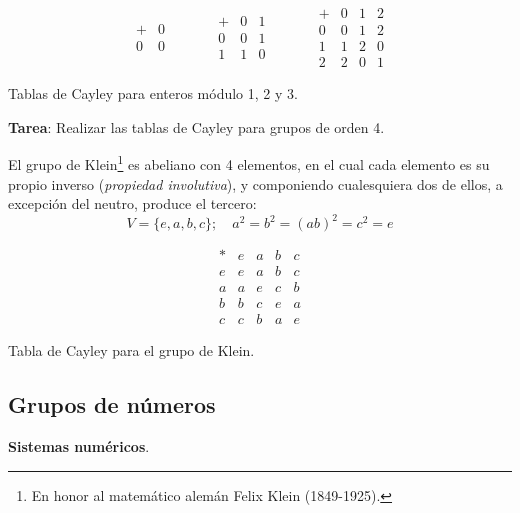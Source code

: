 \begin{table}[H]
	\centering
	\[ \begin{array}{c|c}
		+ & 0 \\ \hline
		0 & 0
	\end{array} \qquad \quad \begin{array}{c|cc}
		+ & 0 & 1 \\ \hline
		0 & 0 & 1 \\
		1 & 1 & 0
	\end{array} \qquad \quad \begin{array}{c|ccc}
		+ & 0 & 1 & 2 \\ \hline
		0 & 0 & 1 & 2 \\
		1 & 1 & 2 & 0 \\
		2 & 2 & 0 & 1
	\end{array}\]
	\caption{Tablas de Cayley para enteros módulo 1, 2 y 3.}
	\label{tab:cayley2}
\end{table}

\textbf{Tarea}: Realizar las tablas de Cayley para grupos de orden 4.

\begin{fmd-example} 
	El grupo de Klein\footnote{En honor al matemático alemán Felix Klein (1849-1925).} es abeliano con 4 elementos, en el cual cada elemento es su propio inverso (\textit{propiedad involutiva}), y componiendo cualesquiera dos de ellos, a excepción del neutro, produce el tercero:
	\[ V = \{ e, a, b, c \}; \quad a^2 = b^2 = (ab)^2 = c^2 = e \]
	\vspace{-15mm}
	\begin{table}[H]
		\centering
		\[ \begin{array}{c|cccc}
			\ast & e & a & b & c \\ \hline
			e & e & a & b & c \\
			a & a & e & c & b \\
			b & b & c & e & a\\
			c & c & b & a & e
		\end{array}\]
		\caption{Tabla de Cayley para el grupo de Klein.}
		\label{tab:Klein}
	\end{table}
\end{fmd-example}

\subsection{Grupos de números}
\textbf{Sistemas numéricos}. 

